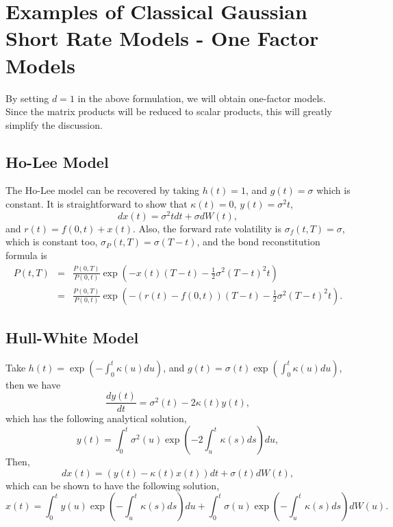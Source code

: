 \documentclass[12pt]{article}
\begin{document}
\section{Examples of Classical Gaussian Short Rate Models - One Factor Models}

  By setting $d=1$ in the above formulation, we will obtain one-factor models. Since the matrix products will be reduced to
  scalar products, this will greatly simplify the discussion.

  \subsection{Ho-Lee Model}

  The Ho-Lee model can be recovered by taking $h(t)=1$, and $g(t)=\sigma$ which is constant. It is straightforward to show that
  $\kappa(t)=0$, $y(t)=\sigma^2t$,
  \begin{equation}
    dx(t)=\sigma^2tdt+\sigma dW(t),
  \end{equation}
  and $r(t)=f(0,t)+x(t)$. Also, the forward rate volatility is $\sigma_f(t,T)=\sigma$, which is constant too, $\sigma_P(t,T)=\sigma(T-t)$, and the bond
  reconstitution formula is
  \begin{eqnarray}
    P(t,T)&=&\frac{P(0,T)}{P(0,t)}\exp\left(-x(t)(T-t)-\frac{1}{2}\sigma^2(T-t)^2t\right)\nonumber\\
          &=&\frac{P(0,T)}{P(0,t)}\exp\left(-\left(r(t)-f(0,t)\right)(T-t)-\frac{1}{2}\sigma^2(T-t)^2t\right).
  \end{eqnarray}


  \subsection{Hull-White Model}

  Take $h(t)=\exp\left(-\int_0^t\kappa(u)du\right)$, and $g(t)=\sigma(t)\exp\left(\int_0^t\kappa(u)du\right)$, then we have
  \begin{equation}
    \frac{dy(t)}{dt} = \sigma^2(t) - 2\kappa(t)y(t),
  \end{equation}
  which has the following analytical solution,
  \begin{equation}
    y(t)=\int_0^t\sigma^2(u)\exp\left(-2\int_u^t\kappa(s)ds\right)du,
  \end{equation}
  Then,
  \begin{equation}
    dx(t)=\left(y(t)-\kappa(t)x(t)\right)dt+\sigma(t)dW(t),
  \end{equation}
  which can be shown to have the following solution,
  \begin{equation}
    x(t)=\int_0^ty(u)\exp\left(-\int_u^t\kappa(s)ds\right)du+\int_0^t\sigma(u)\exp\left(-\int_u^t\kappa(s)ds\right)dW(u).
  \end{equation}
\end{document}
